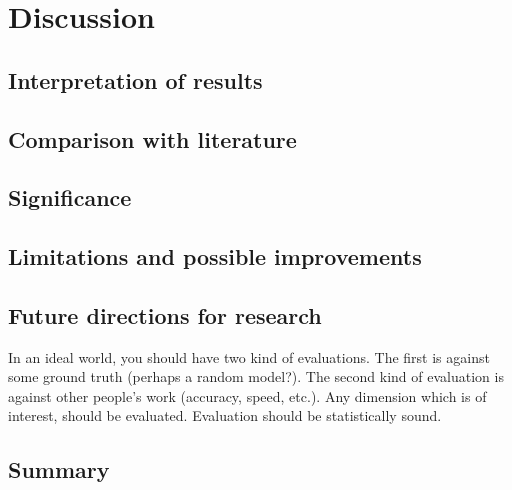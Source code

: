 \chapter{Discussion}

\section{Interpretation of results}

\section{Comparison with literature}

\section{Significance}

\section{Limitations and possible improvements}

\section{Future directions for research}

In an ideal world, you should have two kind of evaluations. The first is against some ground truth (perhaps a random model?). The second kind of evaluation is against other people's work (accuracy, speed, etc.). Any dimension which is of interest, should be evaluated.  Evaluation should be statistically sound.

\Blindtext

\section*{Summary}
\blindtext